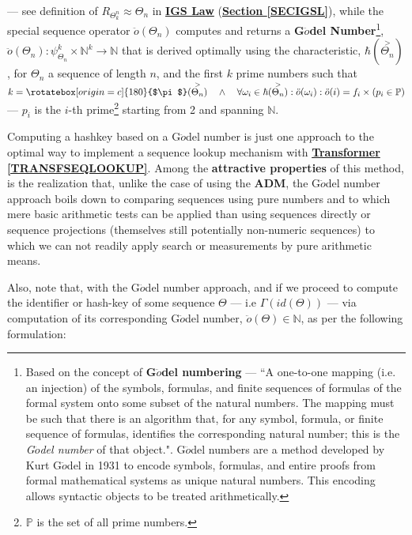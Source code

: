 \documentclass[a4paper, 18pt]{book} %
\newcommand{\invpi}{\rotatebox[origin=c]{180}{$\pi$}}
\begin{document}
 --- see definition of $R_{\Theta^n_k} \approx \Theta_n$ in \textbf{\hyperref[LAWGDL]{IGS Law}} (\textbf{\hyperref[SECIGSL]{Section \ref{SECIGSL}}}), while the special sequence operator $\ddot{o}(\Theta_n)$ computes and returns a \textbf{G$\ddot{o}$del Number}\cite{illingworth1996computing}\footnote{Based on the concept of \textbf{G$\ddot{o}$del numbering} --- ``A one-to-one mapping (i.e. an injection) of the symbols, formulas, and finite sequences of formulas of the formal system onto some subset of the natural numbers. The mapping must be such that there is an algorithm that, for any symbol, formula, or finite sequence of formulas, identifies the corresponding natural number; this is the \textit{G$\ddot{o}$del number} of that object."\cite{illingworth1996computing}. G$\ddot{o}$del numbers are a method developed by Kurt G$\ddot{o}$del in 1931\cite{godel1931} to encode symbols, formulas, and entire proofs from formal mathematical systems as unique natural numbers. This encoding allows syntactic objects to be treated arithmetically\cite{godel1931english}.}, $\ddot{o}(\Theta_n): \psi_{\Theta_n}^k \times\mathbb{N}^k \rightarrow \mathbb{N}$ that is derived optimally using the characteristic, $\hbar(\overset{>}{\Theta_n})$, for $\Theta_n$ a sequence of length $n$, and the first $k$ prime numbers such that $k = \invpi(\overset{>}{\Theta_n}) \quad \land \quad \forall \omega_i \in \hbar(\overset{>}{\Theta_n}): \ddot{o}(\omega_i) : \ddot{o}(i) = f_i \times (p_i \in \mathbb{P})$ --- $p_i$ is the $i$-th prime\footnote{$\mathbb{P}$ is the set of all prime numbers.} starting from 2 and spanning $\mathbb{N}$.
 

Computing a hashkey based on a G$\ddot{o}$del number is just one approach to the optimal way to implement a sequence lookup mechanism with \textbf{\hyperref[TRANSFSEQLOOKUP]{Transformer \ref{TRANSFSEQLOOKUP}}}. Among the \textbf{attractive properties} of this method, is the realization that, unlike the case of using the \textbf{ADM}, the G$\ddot{o}$del number approach boils down to comparing sequences using pure numbers and to which mere basic arithmetic tests can be applied than using sequences directly or sequence projections (themselves still potentially non-numeric sequences) to which we can not readily apply search or measurements by pure arithmetic means.
 
 
 Also, note that, with the G$\ddot{o}$del number approach, and if we proceed to compute the identifier or hash-key of some sequence $\Theta$ --- i.e $\Gamma (id(\Theta))$ --- via computation of its corresponding G$\ddot{o}$del number, $\ddot{o}(\Theta) \in \mathbb{N}$, as per the following formulation:
 
\end{document}
